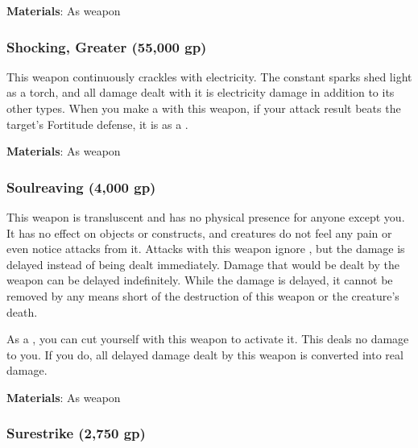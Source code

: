 \vspace{0.25em}
\textbf{Materials}: As weapon


\lowercase{\hypertarget{item:Shocking, Greater}{}}\label{item:Shocking, Greater}
\hypertarget{item:Shocking, Greater}{\subsubsection{Shocking, Greater\hfill{} (55,000 gp)}}

This weapon continuously crackles with electricity.
The constant sparks shed light as a torch, and all damage dealt with it is electricity damage in addition to its other types.
When you make a  with this weapon, if your attack result beats the target's Fortitude defense, it is \dazed as a .



\vspace{0.25em}
\textbf{Materials}: As weapon


\lowercase{\hypertarget{item:Soulreaving}{}}\label{item:Soulreaving}
\hypertarget{item:Soulreaving}{\subsubsection{Soulreaving\hfill{} (4,000 gp)}}

This weapon is transluscent and has no physical presence for anyone except you.
It has no effect on objects or constructs, and creatures do not feel any pain or even notice attacks from it.
Attacks with this weapon ignore , but the damage is delayed instead of being dealt immediately.
Damage that would be dealt by the weapon can be delayed indefinitely.
While the damage is delayed, it cannot be removed by any means short of the destruction of this weapon or the creature's death.

As a , you can cut yourself with this weapon to activate it.
This deals no damage to you.
If you do, all delayed damage dealt by this weapon is converted into real damage.



\vspace{0.25em}
\textbf{Materials}: As weapon


\lowercase{\hypertarget{item:Surestrike}{}}\label{item:Surestrike}
\hypertarget{item:Surestrike}{\subsubsection{Surestrike\hfill{} (2,750 gp)}}

